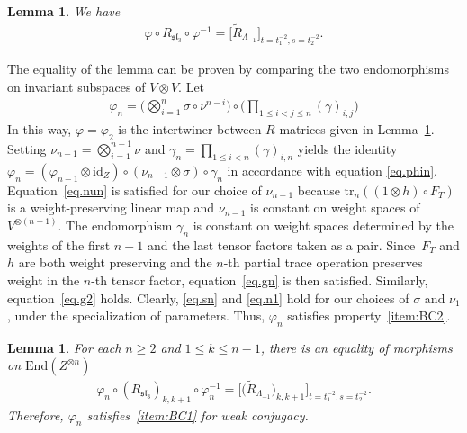\documentclass[pdftex]{sigma}
\numberwithin{equation}{section}
\newtheorem{Lemma}[Theorem]{Lemma}
\theoremstyle{definition}
\begin{document}
\begin{Lemma}\label{lem:R2}
We have
\begin{gather*}
 \varphi\circ {R}_{\mathfrak{sl}_3}\circ\varphi^{-1}=  \bigl\lbrack
\tilde{R}_{\Lambda_{-1}} \bigr\rbrack_{t=t_1^{-2}, s=t_2^{-2}} .
\end{gather*}
\end{Lemma}
The equality of the lemma can be proven by comparing the two endomorphisms on invariant subspaces
of $V\otimes V$.
Let
\begin{gather*}
 \varphi_n=\biggl(\bigotimes_{i=1}^n \sigma\circ\nu^{n-i}\biggr)\circ
 \biggl(\prod_{1\leq i<j\leq n}(\gamma)_{i,j}\biggr)
\end{gather*}
In this way, $\varphi=\varphi_2$ is the intertwiner between $R$-matrices given in
Lemma~\ref{lem:R2}. Setting $\nu_{n-1}=\bigotimes_{i=1}^{n-1} \nu$ and
$\gamma_n=\prod_{1\leq i<n} (\gamma)_{i,n}$ yields the identity
$\varphi_n=(\varphi_{n-1}\otimes \mathrm{id}_Z)\circ(\nu_{n-1}\otimes\sigma)\circ \gamma_n$
in accordance with equation \eqref{eq.phin}. Equation~\eqref{eq.nun} is satisfied
for our choice of $\nu_{n-1}$ because ${\mathrm{tr}_n((1\otimes h)\circ F_T)}$ is a
weight-preserving linear map and $\nu_{n-1}$ is constant on weight spaces of~$V^{\otimes (n-1)}$. The endomorphism $\gamma_n$ is constant on weight spaces determined
by the weights of the first $n-1$ and the last tensor factors taken as a pair.
Since~$F_T$ and $h$ are both weight preserving and the $n$-th partial trace
operation preserves weight in the $n$-th tensor factor, equation~\eqref{eq.gn} is
then satisfied. Similarly, equation~\eqref{eq.g2} holds. Clearly, \eqref{eq.sn} and \eqref{eq.n1} hold for our choices of $\sigma$ and $\nu_1$, under the
specialization of parameters. Thus, $\varphi_n$ satisfies property~\eqref{item:BC2}.

\begin{Lemma}\label{lem.Rn}
For each $n\geq 2$ and $1\leq k\leq n-1$, there is an equality of morphisms on
$\mathrm{End}(Z^{\otimes n})$
\begin{gather*}
\varphi_n\circ({R}_{\mathfrak{sl}_3})_{k,k+1}\circ\varphi_n^{-1}
= \bigl\lbrack \bigl(\tilde{R}_{\Lambda_{-1}}\bigr)_{k,k+1} \bigr\rbrack_{t=t_1^{-2}, s=t_2^{-2}} .
\end{gather*}
Therefore, $\varphi_n$ satisfies~\eqref{item:BC1} for weak conjugacy.
\end{Lemma}
\end{document}
